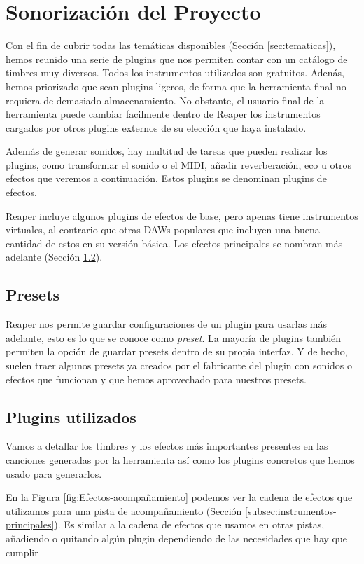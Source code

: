 \chapter{Sonorización del Proyecto}

Con el fin de cubrir todas las temáticas disponibles (Sección \ref{sec:tematicas}), hemos reunido una serie de plugins que nos permiten contar con un catálogo de timbres muy diversos. Todos los instrumentos utilizados son gratuitos. Adenás, hemos priorizado que sean plugins ligeros, de forma que la herramienta final no requiera de demasiado almacenamiento. No obstante, el usuario final de la herramienta puede cambiar facilmente dentro de Reaper los instrumentos cargados por otros plugins externos de su elección que haya instalado.

Además de generar sonidos, hay multitud de tareas que pueden realizar los plugins, como transformar el sonido o el MIDI, añadir reverberación, eco u otros efectos que veremos a continuación. Estos plugins se denominan plugins de efectos.

Reaper incluye algunos plugins de efectos de base, pero apenas tiene instrumentos virtuales, al contrario que otras DAWs populares que incluyen una buena cantidad de estos en su versión básica. Los efectos principales se nombran más adelante (Sección \ref{subsec:plugins-utilizados}).

\section{Presets}
Reaper nos permite guardar configuraciones de un plugin para usarlas más adelante, esto es lo que se conoce como \textit{preset}. La mayoría de plugins también permiten la opción de guardar presets dentro de su propia interfaz. Y de hecho, suelen traer algunos presets ya creados por el fabricante del plugin con sonidos o efectos que funcionan y que hemos aprovechado para nuestros presets.

\section{Plugins utilizados}\label{subsec:plugins-utilizados}
Vamos a detallar los timbres y los efectos más importantes presentes en las canciones generadas por la herramienta así como los plugins concretos que hemos usado para generarlos. 

En la Figura \ref{fig:Efectos-acompañamiento} podemos ver la cadena de efectos que utilizamos para una pista de acompañamiento (Sección \ref{subsec:instrumentos-principales}). Es similar a la cadena de efectos que usamos en otras pistas, añadiendo o quitando algún plugin dependiendo de las necesidades que hay que cumplir

